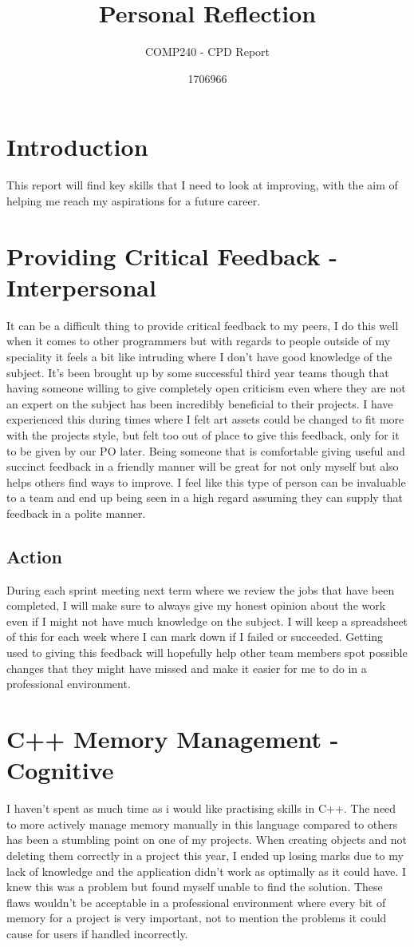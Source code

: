 \documentclass{scrartcl}
\title{Personal Reflection}
\subtitle{COMP240 - CPD Report}
\author{1706966}
\begin{document}
\maketitle

\section{Introduction}
This report will find key skills that I need to look at improving, with the aim of helping me reach my aspirations for a future career.

\section{Providing Critical Feedback - Interpersonal}
It can be a difficult thing to provide critical feedback to my peers, I do this well when it comes to other programmers but with regards to people outside of my speciality it feels a bit like intruding where I don't have good knowledge of the subject. It's been brought up by some successful third year teams though that having someone willing to give completely open criticism even where they are not an expert on the subject has been incredibly beneficial to their projects. I have experienced this during times where I felt art assets could be changed to fit more with the projects style, but felt too out of place to give this feedback, only for it to be given by our PO later. Being someone that is comfortable giving useful and succinct feedback in a friendly manner will be great for not only myself but also helps others find ways to improve. I feel like this type of person can be invaluable to a team and end up being seen in a high regard assuming they can supply that feedback in a polite manner.
\subsection{Action}
During each sprint meeting next term where we review the jobs that have been completed, I will make sure to always give my honest opinion about the work even if I might not have much knowledge on the subject. I will keep a spreadsheet of this for each week where I can mark down if I failed or succeeded. Getting used to giving this feedback will hopefully help other team members spot possible changes that they might have missed and make it easier for me to do in a professional environment.

\section{C++ Memory Management - Cognitive}
I haven't spent as much time as i would like practising skills in C++. The need to more actively manage memory manually in this language compared to others has been a stumbling point on one of my projects. When creating objects and not deleting them correctly in a project this year, I ended up losing marks due to my lack of knowledge and the application didn't work as optimally as it could have. I knew this was a problem but found myself unable to find the solution.
These flaws wouldn't be acceptable in a professional environment where every bit of memory for a project is very important, not to mention the problems it could cause for users if handled incorrectly. 
\end{document}
